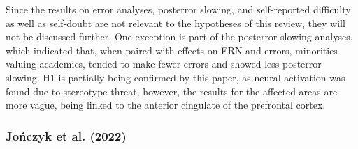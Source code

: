 \documentclass[
  stu]{apa7}
\begin{document}
Since the results on error analyses, posterror slowing, and self-reported difficulty as well as self-doubt are not relevant to the hypotheses of this review, they will not be discussed further.
One exception is part of the posterror slowing analyses, which indicated that, when paired with effects on ERN and errors, minorities valuing academics, tended to make fewer errors and showed less posterror slowing.
H1 is partially being confirmed by this paper, as neural activation was found due to stereotype threat, however, the results for the affected areas are more vague, being linked to the anterior cingulate of the prefrontal cortex.

\subsubsection{Jończyk et al. (2022)}\label{jonczykhowstereotypethreat2022}
\end{document}
